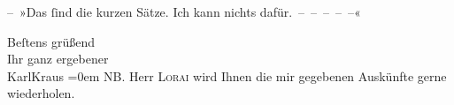 \pstart
           – »Das{ }ſind die kurzen Sätze. Ich kann nichts dafür. – – – – –«\pend
           
\pstart
           Beſtens grüßend{\\[\baselineskip]}Ihr ganz ergebener{\\[\baselineskip]}\spacefill\mbox{KarlKraus}\pend
           \leftskip=0em{}
\pstart
           \noindent{}\textsc{NB}. Herr \textsc{Lorai} wird Ihnen die mir gegebenen Auskünfte gerne wiederholen.\pend
           \endnumbering{}  \newcommand{\dateiname}{L00432}\newcommand{\titel}{Karl Kraus an Arthur Schnitzler, 25. 4. 1895}\newcommand{\editorInnen}{Martin Anton Müller und Gerd-Hermann Susen}
